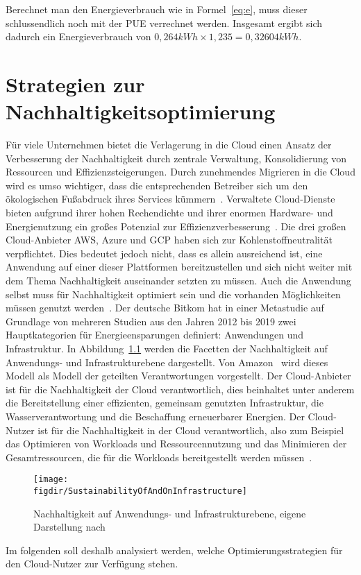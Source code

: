 Berechnet man den Energieverbrauch wie in Formel~\ref{eq:e}, muss dieser schlussendlich noch mit der \ac{PUE} verrechnet werden.
Insgesamt ergibt sich dadurch ein Energieverbrauch von $0,264kWh \times 1,235 = 0,32604kWh$.
\chapter{Strategien zur Nachhaltigkeitsoptimierung}\label{CAP:strategies}
Für viele Unternehmen bietet die Verlagerung in die Cloud einen Ansatz der Verbesserung der Nachhaltigkeit durch zentrale Verwaltung, Konsolidierung von Ressourcen und Effizienzsteigerungen.
Durch zunehmendes Migrieren in die Cloud wird es umso wichtiger, dass die entsprechenden Betreiber sich um den ökologischen Fußabdruck ihres Services kümmern~\cite{Buchanan.2023}.
Verwaltete Cloud-Dienste bieten aufgrund ihrer hohen Rechendichte und ihrer enormen Hardware- und Energienutzung ein großes Potenzial zur Effizienzverbesserung~\cite{Currie.2024}.
Die drei großen Cloud-Anbieter \ac{AWS}, Azure und \ac{GCP} haben sich zur Kohlenstoffneutralität verpflichtet.
Dies bedeutet jedoch nicht, dass es allein ausreichend ist, eine Anwendung auf einer dieser Plattformen bereitzustellen und sich nicht weiter mit dem Thema Nachhaltigkeit auseinander setzten zu müssen.
Auch die Anwendung selbst muss für Nachhaltigkeit optimiert sein und die vorhanden Möglichkeiten müssen genutzt werden~\cite{Newman.2023}.
Der deutsche Bitkom hat in einer Metastudie auf Grundlage von mehreren Studien aus den Jahren 2012 bis 2019 zwei Hauptkategorien für Energieensparungen definiert: Anwendungen und Infrastruktur.
In Abbildung~\ref{FIG:sustainability-infrastructure} werden die Facetten der Nachhaltigkeit auf Anwendungs- und Infrastrukturebene dargestellt.
Von Amazon~\cite{Mokhtari.2023} wird dieses Modell als Modell der geteilten Verantwortungen vorgestellt.
Der Cloud-Anbieter ist für die Nachhaltigkeit der Cloud verantwortlich, dies beinhaltet unter anderem die Bereitstellung einer effizienten, gemeinsam genutzten Infrastruktur, die Wasserverantwortung und die Beschaffung erneuerbarer Energien.
Der Cloud-Nutzer ist für die Nachhaltigkeit in der Cloud verantwortlich, also zum Beispiel das Optimieren von Workloads und Ressourcennutzung und das Minimieren der Gesamtressourcen, die für die Workloads bereitgestellt werden müssen~\cite{Mokhtari.2023}.
\begin{figure}
 \caption[Nachhaltigkeit auf Anwendungs- und Infrastrukturebene]{Nachhaltigkeit auf Anwendungs- und Infrastrukturebene, eigene Darstellung nach ~\cite{Mokhtari.2023}}
 {\texttt{[image: \\figdir/SustainabilityOfAndOnInfrastructure]}}
 \label{FIG:sustainability-infrastructure}
\end{figure}
Im folgenden soll deshalb analysiert werden, welche Optimierungsstrategien für den Cloud-Nutzer zur Verfügung stehen.

